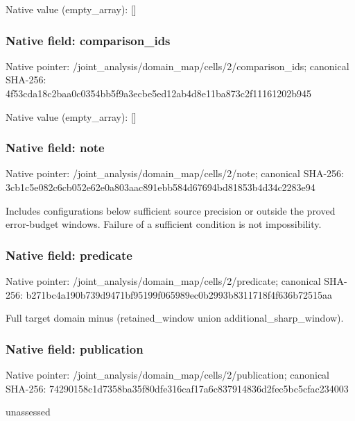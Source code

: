 \documentclass[10pt,a4paper]{article}
\begin{document}
Native value (empty\_\allowbreak{}array): []

\subsubsection{Native field: comparison\_\allowbreak{}ids}
Native pointer: /joint\_\allowbreak{}analysis/domain\_\allowbreak{}map/cells/2/comparison\_\allowbreak{}ids; canonical SHA-256: 4f53cda18c2baa0c0354bb5f9a3ecbe5ed12ab4d8e11ba873c2f11161202b945

Native value (empty\_\allowbreak{}array): []

\subsubsection{Native field: note}
Native pointer: /joint\_\allowbreak{}analysis/domain\_\allowbreak{}map/cells/2/note; canonical SHA-256: 3cb1c5e082c6cb052e62e0a803aac891ebb584d67694bd81853b4d34c2283e94

\begingroup\raggedright\sloppy Includes configurations below sufficient source precision or outside the proved error-budget windows. Failure of a sufficient condition is not impossibility.\par\endgroup

\subsubsection{Native field: predicate}
Native pointer: /joint\_\allowbreak{}analysis/domain\_\allowbreak{}map/cells/2/predicate; canonical SHA-256: b271bc4a190b739d9471bf95199f065989ec0b2993b8311718f4f636b72515aa

\begingroup\raggedright\sloppy Full target domain minus (retained\_\allowbreak{}window union additional\_\allowbreak{}sharp\_\allowbreak{}window).\par\endgroup

\subsubsection{Native field: publication}
Native pointer: /joint\_\allowbreak{}analysis/domain\_\allowbreak{}map/cells/2/publication; canonical SHA-256: 74290158c1d7358ba35f80dfe316caf17a6c837914836d2fec5bc5cfac234003

\begingroup\raggedright\sloppy unassessed\par\endgroup
\end{document}
